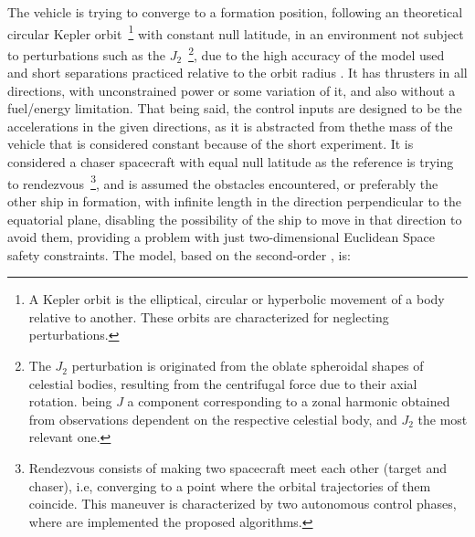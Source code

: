 The vehicle is trying to converge to a formation position, following an theoretical circular Kepler orbit~\footnote{A Kepler orbit  is the elliptical, circular or hyperbolic movement of a body relative to another. These orbits are characterized for neglecting perturbations.} with constant null latitude, in an environment not subject to perturbations such as the \(J_2\)~\footnote{ The \(J_2\) perturbation \cite{curtis2019orbital} is originated from  the oblate spheroidal shapes of celestial bodies, resulting from the centrifugal force due to their axial rotation. being \(J\) a component corresponding to a zonal harmonic obtained from observations dependent on the respective celestial body, and \(J_2\) the most relevant one. }, due to the high accuracy of the model used and short separations practiced relative to the orbit radius \cite{kaczmarek2023autonomous}. It has thrusters in all directions, with unconstrained power or some variation of it, and also without a fuel/energy limitation. That being said, the control inputs are designed to be the accelerations in the given directions, as it is abstracted from thethe mass of the vehicle that is considered constant because of the short experiment. It is considered a chaser spacecraft with equal null latitude as the reference \txtref is trying to rendezvous~\footnote{ Rendezvous \cite{luo2014survey} consists of making two spacecraft meet each other (target and chaser), i.e, converging to a point where the orbital trajectories of them coincide. This maneuver is characterized by two autonomous control phases, where are implemented the proposed algorithms.}, and is assumed the obstacles encountered, or preferably the other ship in formation, with infinite length in the direction perpendicular to the equatorial plane, disabling the possibility of the ship to move in that direction to avoid them, providing a problem with just two-dimensional Euclidean Space safety constraints.  The model, based on the second-order  \cite{sullivan2017comprehensive}, is:

